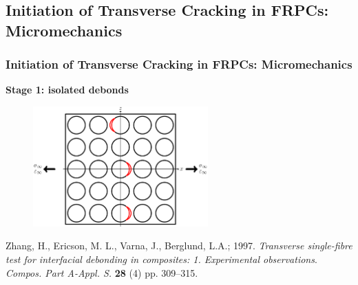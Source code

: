 \documentclass[first,firstsupp,lastsupp,last,hyperref,table]{ETHclass}
\begin{document}
\subsection[Micromechanics of Initiation]{Initiation of Transverse Cracking in FRPCs: Micromechanics}

\begin{frame}
\frametitle{\vspace{0.2cm}\small Initiation of Transverse Cracking in FRPCs: Micromechanics}
\vspace{-0.75cm}
\centering
\begin{alertblock}{\centering\scriptsize\bf Stage 1: isolated debonds}
\begin{figure}
\centering
\includegraphics[width=0.6\textwidth]{stage1-isolateddebonds.pdf}
\end{figure}
\end{alertblock}
\vspace{-0.5cm}
{\tiny Zhang, H., Ericson, M. L., Varna, J., Berglund, L.A.; 1997. {\em\tiny Transverse single-fibre test for interfacial debonding in composites: 1. Experimental observations}. {\it\tiny Compos. Part A-Appl. S.} {\bf\tiny 28} (4) pp. 309--315.}
\end{frame}
\end{document}
